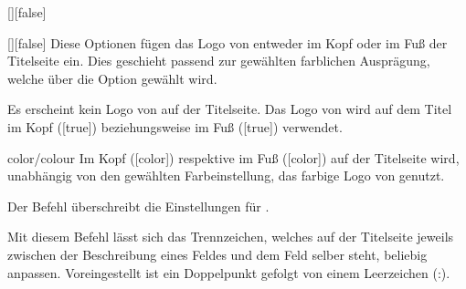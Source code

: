 \documentclass[%
  english,ngerman,%
  headings=optiontoheadandtoc,captions=tableheading,numbers=noenddot,%
  chapterpage,cdfoot,%
]{tudscrman}
\begin{document}
\begin{Declaration}{[\PSet]}[false]
\begin{Declaration}{[\PSet]}[false]
\printdeclarationlist%
%
%
Diese Optionen fügen das Logo von \DDC entweder im Kopf oder im Fuß der 
Titelseite ein. Dies geschieht passend zur gewählten farblichen Ausprägung, 
welche über die Option  gewählt wird.
%
\begin{values}
\itemfalse
  Es erscheint kein Logo von \DDC auf der Titelseite.
\itemtrue*
  Das Logo von \DDC wird auf dem Titel im Kopf ([true]) 
  beziehungsweise im Fuß ([true]) verwendet.
\item[color/colour]
  Im Kopf ([color]) respektive im Fuß ([color]) 
  auf der Titelseite wird, unabhängig von den gewählten Farbeinstellung, das 
  farbige Logo von \DDC genutzt.
\end{values}
%
Der Befehl  überschreibt die Einstellungen 
für .
\end{Declaration}
\end{Declaration}

\begin{Declaration}{}
\printdeclarationlist%
%
Mit diesem Befehl lässt sich das Trennzeichen, welches auf der Titelseite 
jeweils zwischen der Beschreibung eines Feldes und dem Feld selber steht, 
beliebig anpassen. Voreingestellt ist ein Doppelpunkt gefolgt von einem 
Leerzeichen (:).
\end{Declaration}
\end{document}
